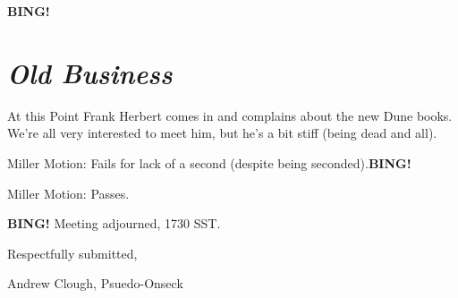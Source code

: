 \documentclass[10pt]{article}
\newcommand{\bing}{{\bf BING!} }
\newcommand{\goto}[1]{\bing \vskip 12pt \section*{{\em{#1}}}}
\begin{document}

\goto{Old Business}

At this Point Frank Herbert comes in and complains about the new Dune books.  We're all very interested to meet him, but he's a bit stiff (being dead and all).

Miller Motion:  Fails for lack of a second (despite being seconded).\bing

Miller Motion:  Passes.

\bing
\noindent
Meeting adjourned, 1730 SST.

\vspace{18pt}

\centerline{Respectfully submitted,}
\centerline{Andrew Clough, Psuedo-Onseck}
\end{document}
